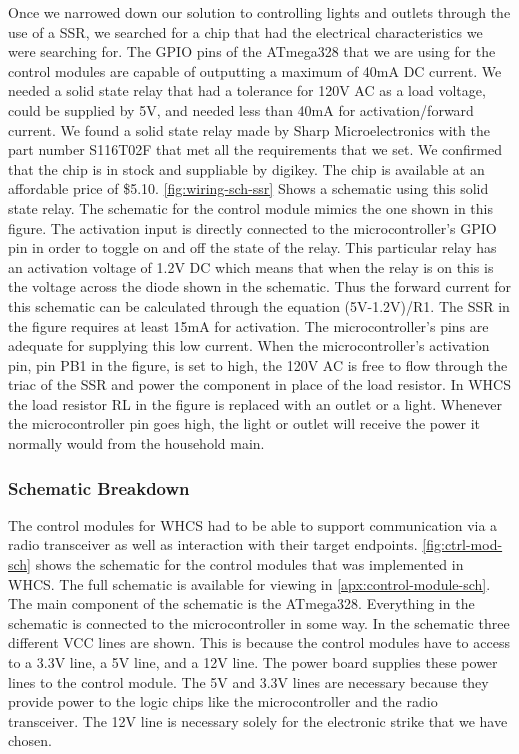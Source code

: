 Once we narrowed down our solution to controlling lights and outlets through
the use of a SSR, we searched for a chip that had the electrical
characteristics we were searching for. The GPIO pins of the ATmega328 that we
are using for the control modules are capable of outputting a maximum of 40mA
DC current. We needed a solid state relay that had a tolerance for 120V AC as a
load voltage, could be supplied by 5V, and needed less than 40mA for
activation/forward current. We found a solid state relay made by Sharp
Microelectronics with the part number S116T02F that met all the requirements
that we set. We confirmed that the chip is in stock and suppliable by digikey.
The chip is available at an affordable price of \$5.10. \autoref{fig:wiring-sch-ssr}
Shows a schematic using this solid state relay. The schematic for the control
module mimics the one shown in this figure. The activation input is 
directly connected to the microcontroller{}'s GPIO pin in order to toggle on
and off the state of the relay. This particular relay has an activation voltage
of 1.2V DC which means that when the relay is on this is the voltage across the
diode shown in the schematic. Thus the forward current for this schematic can
be calculated through the equation (5V{}-1.2V)/R1. The SSR in the figure
requires at least 15mA for activation. The microcontroller{}'s pins are
adequate for supplying this low current. When the microcontroller{}'s
activation pin, pin PB1 in the figure, is set to high, the 120V AC is free to
flow through the triac of the SSR and power the component in place of the load
resistor. In WHCS the load resistor RL in the figure is replaced with an
outlet or a light. Whenever the microcontroller pin goes high, the light or
outlet will receive the power it normally would from the household main.


\subsubsection{Schematic Breakdown}
The control modules for WHCS had to be able to support communication via a
radio transceiver as well as interaction with their target endpoints.
\autoref{fig:ctrl-mod-sch} shows the schematic for the control modules that was 
implemented in WHCS. The full schematic is available for viewing in \autoref{apx:control-module-sch}. The main component of the schematic is the ATmega328.
Everything in the schematic is connected to the microcontroller in some way. In
the schematic three different VCC lines are shown. This is because the control
modules have to access to a 3.3V line, a 5V line, and a 12V line. The
power board supplies these power lines to the control module. The 5V and
3.3V lines are necessary because they provide power to the logic chips like the
microcontroller and the radio transceiver. The 12V line is necessary solely for
the electronic strike that we have chosen.

